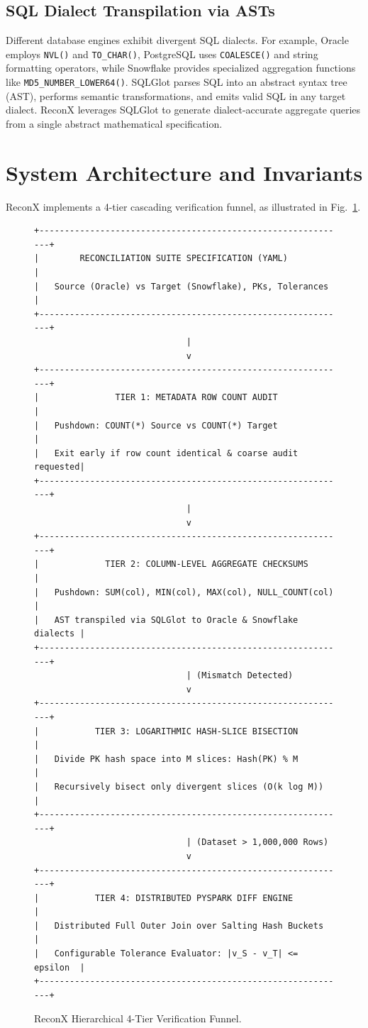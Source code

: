 \documentclass[10pt,journal,compsoc]{IEEEtran}
\begin{document}
\subsection{SQL Dialect Transpilation via ASTs}
Different database engines exhibit divergent SQL dialects. For example, Oracle employs \texttt{NVL()} and \texttt{TO\_CHAR()}, PostgreSQL uses \texttt{COALESCE()} and string formatting operators, while Snowflake provides specialized aggregation functions like \texttt{MD5\_NUMBER\_LOWER64()}. SQLGlot parses SQL into an abstract syntax tree (AST), performs semantic transformations, and emits valid SQL in any target dialect. ReconX leverages SQLGlot to generate dialect-accurate aggregate queries from a single abstract mathematical specification.

\section{System Architecture and Invariants}
ReconX implements a 4-tier cascading verification funnel, as illustrated in Fig.~\ref{fig:recon_arch}.

\begin{figure}[!t]
\centering
\begin{lstlisting}
+-------------------------------------------------------------+
|        RECONCILIATION SUITE SPECIFICATION (YAML)            |
|   Source (Oracle) vs Target (Snowflake), PKs, Tolerances    |
+-------------------------------------------------------------+
                              |
                              v
+-------------------------------------------------------------+
|               TIER 1: METADATA ROW COUNT AUDIT              |
|   Pushdown: COUNT(*) Source vs COUNT(*) Target              |
|   Exit early if row count identical & coarse audit requested|
+-------------------------------------------------------------+
                              |
                              v
+-------------------------------------------------------------+
|             TIER 2: COLUMN-LEVEL AGGREGATE CHECKSUMS        |
|   Pushdown: SUM(col), MIN(col), MAX(col), NULL_COUNT(col)   |
|   AST transpiled via SQLGlot to Oracle & Snowflake dialects |
+-------------------------------------------------------------+
                              | (Mismatch Detected)
                              v
+-------------------------------------------------------------+
|           TIER 3: LOGARITHMIC HASH-SLICE BISECTION          |
|   Divide PK hash space into M slices: Hash(PK) % M          |
|   Recursively bisect only divergent slices (O(k log M))     |
+-------------------------------------------------------------+
                              | (Dataset > 1,000,000 Rows)
                              v
+-------------------------------------------------------------+
|           TIER 4: DISTRIBUTED PYSPARK DIFF ENGINE           |
|   Distributed Full Outer Join over Salting Hash Buckets     |
|   Configurable Tolerance Evaluator: |v_S - v_T| <= epsilon  |
+-------------------------------------------------------------+
\end{lstlisting}
\caption{ReconX Hierarchical 4-Tier Verification Funnel.}
\label{fig:recon_arch}
\end{figure}
\end{document}
